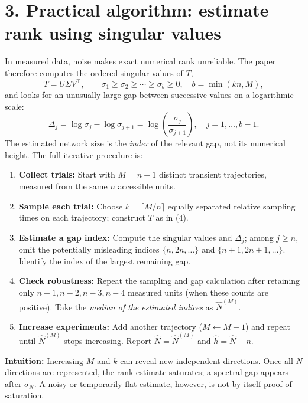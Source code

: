 \documentclass[10pt,a4paper]{article}
\begin{document}
\section{3. Practical algorithm: estimate rank using singular values}
In measured data, noise makes exact numerical rank unreliable. The paper therefore computes the ordered singular values of $T$,
\[
 T=U\Sigma V^\top,\qquad
 \sigma_1\ge\sigma_2\ge\cdots\ge\sigma_b\ge0,\quad b=\min(kn,M),
\]
and looks for an unusually large gap between successive values on a logarithmic scale:
\begin{equation}
\boxed{\Delta_j=\log\sigma_j-\log\sigma_{j+1}
=\log\left(\frac{\sigma_j}{\sigma_{j+1}}\right),\quad j=1,\ldots,b-1.}\tag{7}
\end{equation}
The estimated network size is the \emph{index} of the relevant gap, not its numerical height. The full iterative procedure is:
\begin{enumerate}[label=\textbf{\arabic*.}]
\item \textbf{Collect trials:} Start with $M=n+1$ distinct transient trajectories, measured from the same $n$ accessible units.
\item \textbf{Sample each trial:} Choose $k=\lceil M/n\rceil$ equally separated relative sampling times on each trajectory; construct $T$ as in (4).
\item \textbf{Estimate a gap index:} Compute the singular values and $\Delta_j$; among $j\ge n$, omit the potentially misleading indices $\{n,2n,\ldots\}$ and $\{n+1,2n+1,\ldots\}$. Identify the index of the largest remaining gap.
\item \textbf{Check robustness:} Repeat the sampling and gap calculation after retaining only $n-1,n-2,n-3,n-4$ measured units (when these counts are positive). Take the \emph{median of the estimated indices} as $\widehat N^{(M)}$.
\item \textbf{Increase experiments:} Add another trajectory ($M\leftarrow M+1$) and repeat until $\widehat N^{(M)}$ stops increasing. Report $\widehat N=\widehat N^{(M)}$ and $\widehat h=\widehat N-n$.
\end{enumerate}
\vspace{-2pt}
\textbf{Intuition:} Increasing $M$ and $k$ can reveal new independent directions. Once all $N$ directions are represented, the rank estimate saturates; a spectral gap appears after $\sigma_N$. A noisy or temporarily flat estimate, however, is not by itself proof of saturation.
\end{document}
